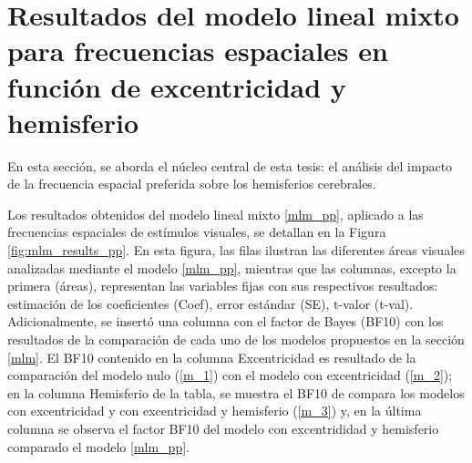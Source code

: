 \section{Resultados del modelo lineal mixto para frecuencias espaciales en función de excentricidad y hemisferio}


En esta secci\'on, se aborda el núcleo central de esta tesis: el análisis del impacto de la frecuencia espacial preferida sobre los hemisferios cerebrales. 

Los resultados obtenidos del modelo lineal mixto \ref{mlm_pp}, aplicado a las frecuencias espaciales de estímulos visuales, se detallan en la Figura \ref{fig:mlm_results_pp}. En esta figura, las filas ilustran las diferentes áreas visuales analizadas mediante el modelo \ref{mlm_pp}, mientras que las columnas, excepto la primera (\'areas), representan las variables fijas con sus respectivos resultados:  estimación de los coeficientes (Coef), error estándar (SE), t-valor (t-val). Adicionalmente, se insert\'o una columna con el factor de Bayes (BF10) con los resultados de la comparaci\'on de cada uno de los modelos propuestos en la secci\'on \ref{mlm}. El BF10 contenido en la columna Excentricidad es resultado de la comparaci\'on del modelo nulo (\ref{m_1}) con el modelo con excentricidad (\ref{m_2}); en la columna Hemisferio de la tabla, se muestra el BF10 de compara los modelos con excentricidad  y con excentricidad y hemisferio (\ref{m_3}) y, en la \'ultima columna se observa el factor BF10 del modelo con excentrididad y hemisferio comparado el modelo \ref{mlm_pp}.


